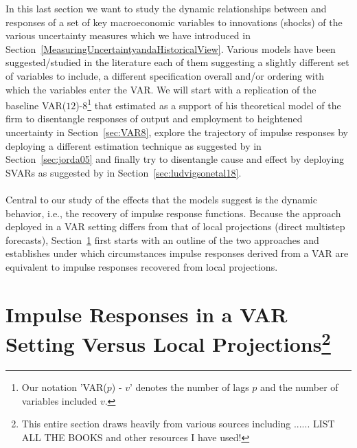 \documentclass[a4paper,11pt,listof=nochaptergap,oneside,pointednumbers,bibtotoc,bigheadings,liststotoc]{scrbook}
\theoremstyle{mysatz}
\theoremstyle{mydefinition}
\theoremstyle{mybemerkung}
\begin{document}
\endgroup

In this last section we want to study the dynamic relationships between and responses of a set of key macroeconomic variables to innovations (shocks) of the various uncertainty measures which we have introduced in Section~\ref{MeasuringUncertaintyandaHistoricalView}. Various models have been suggested/studied in the literature each of them suggesting a slightly different set of variables to include, a different specification overall and/or ordering with which the variables enter the VAR. We will start with a replication of the baseline VAR($12$)-8\footnote{Our notation 'VAR($p$) - $v$' denotes the number of lags $p$ and the number of variables included $v$.} that \citet{bloom:09} estimated as a support of his theoretical model of the firm to disentangle responses of output and employment to heightened uncertainty in Section~\ref{sec:VAR8}, explore the trajectory of impulse responses by deploying a different estimation technique as suggested by \citet{jorda:05} in Section~\ref{sec:jorda05} and finally try to disentangle cause and effect by deploying SVARs as suggested by \citet{ludvigsonetal:18} in Section~\ref{sec:ludvigsonetal18}.\\
\\
Central to our study of the effects that the models suggest is the dynamic behavior, i.e., the recovery of impulse response functions. Because the approach deployed in a VAR setting differs from that of local projections (direct multistep forecasts), Section~\ref{sec:IRFsVARversusLocalProj} first starts with an outline of the two approaches and establishes under which circumstances impulse responses derived from a VAR are equivalent to impulse responses recovered from local projections.

\section[Impulse Responses in a VAR Setting Versus Local Projections]{Impulse Responses in a VAR Setting Versus Local Projections\footnote{This entire section draws heavily from various sources including ...... LIST ALL THE BOOKS and other resources I have used!}}
\label{sec:IRFsVARversusLocalProj}
\end{document}
